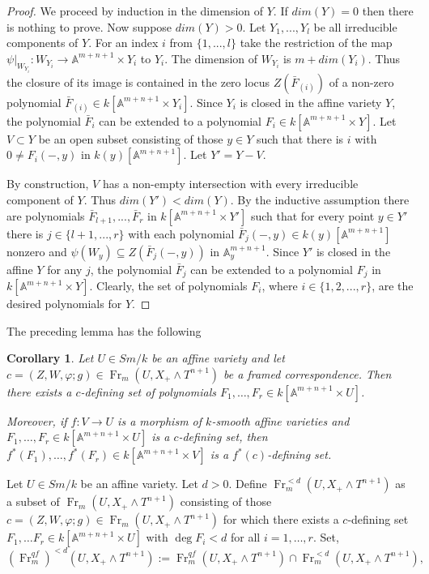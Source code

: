 \documentclass[a4paper,11pt,reqno]{amsart}
\newtheorem{corollary}[theorem]{Corollary}
\begin{document}
\begin{proof}
We proceed by induction in the dimension of $Y$. If $dim(Y)=0$ then
there is nothing to prove. Now suppose $dim(Y)>0$. Let $Y_1,...,Y_l$
be all irreducible components of $Y$. For an index $i$ from
$\{1,...,l\}$ take the restriction of the map $\psi|_{W_{Y_i}}\colon
W_{Y_i}\to{\mathbb{A}}^{m+n+1}\times Y_i$ to $Y_i$. The dimension of $W_{Y_i}$
is $m+dim(Y_i)$. Thus the closure of its image is contained in the
zero locus $Z(\bar F_{(i)})$ of a non-zero polynomial $\bar
F_{(i)}\in k[{\mathbb{A}}^{m+n+1}\times Y_i]$. Since $Y_i$ is closed in the
affine variety $Y$, the polynomial $\bar F_i$ can be extended to a
polynomial $F_i\in k[{\mathbb{A}}^{m+n+1}\times Y]$. Let $V\subset Y$ be an
open subset consisting of those $y\in Y$ such that there is $i$ with
$0\neq F_i(-,y)$ in $k(y)[{\mathbb{A}}^{m+n+1}]$. Let $Y'=Y-V$.

By construction, $V$ has a non-empty intersection with every
irreducible component of $Y$. Thus $dim(Y')<dim(Y)$. By the
inductive assumption there are polynomials $\bar F_{l+1},...,\bar
F_{r}$ in $k[{\mathbb{A}}^{m+n+1}\times Y']$ such that for every point $y\in
Y'$ there is $j\in \{l+1,...,r\}$ with each polynomial $\bar
F_j(-,y) \in k(y)[{\mathbb{A}}^{m+n+1}]$ nonzero and $\psi(W_y)\subseteq
Z(\bar F_j(-,y))$ in ${\mathbb{A}}^{m+n+1}_y$. Since $Y'$ is closed in the
affine $Y$ for any $j$, the polynomial $\bar F_j$ can be extended to
a polynomial $F_j$ in $k[{\mathbb{A}}^{m+n+1}\times Y]$. Clearly, the set of
polynomials $F_i$, where $i\in \{1,2,...,r\}$, are the desired
polynomials for $Y$.
\end{proof}

The preceding lemma has the following

\begin{corollary}\label{cor:existdef}
Let $U\in Sm/k$ be an affine variety and let $c=(Z,W,{\varphi};g)\in
{\operatorname{Fr}}_m(U,X_+\wedge T^{n+1})$ be a framed correspondence. Then there
exists a $c$-defining set of polynomials $F_1,\ldots, F_r \in
k[{\mathbb{A}}^{m+n+1}\times U]$.

Moreover, if $f: V\to U$ is a morphism of
$k$-smooth affine varieties and $F_1,\ldots, F_r \in
k[{\mathbb{A}}^{m+n+1}\times U]$ is a $c$-defining set, then $f^*(F_1),\ldots,
f^*(F_r) \in k[{\mathbb{A}}^{m+n+1}\times V]$ is a $f^*(c)$-defining set.
\end{corollary}

Let $U\in Sm/k$ be an affine variety. Let $d>0$. Define
${\operatorname{Fr}}_m^{<d}(U,X_+\wedge T^{n+1})$ as a subset of ${\operatorname{Fr}}_m(U,X_+\wedge
T^{n+1})$ consisting of those $c=(Z,W,{\varphi};g)\in {\operatorname{Fr}}_m(U,X_+\wedge
T^{n+1})$ for which there exists a $c$-defining set $F_1,\ldots F_r
\in k[{\mathbb{A}}^{m+n+1}\times U]$ with $\deg F_i<d$ for all $i=1,\ldots,r$.
Set,
   $$({\operatorname{Fr}}^{qf}_m)^{<d}(U,X_+\wedge T^{n+1}):= {\operatorname{Fr}}^{qf}_m(U,X_+\wedge T^{n+1}) \cap{\operatorname{Fr}}_m^{<d}(U,X_+\wedge T^{n+1}),$$
\end{document}
